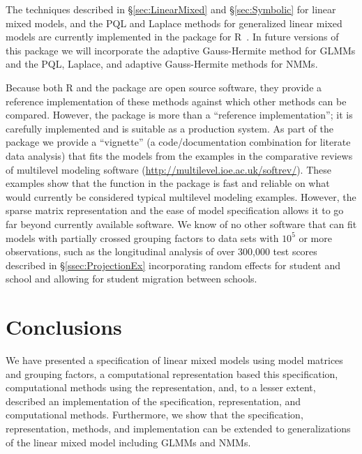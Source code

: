 \documentclass[12pt]{article}
\begin{document}
The techniques described in \S\ref{sec:LinearMixed} and
\S\ref{sec:Symbolic} for linear mixed models, and the PQL and Laplace
methods for generalized linear mixed models are currently implemented
in the  package for R~\citep{R-2.0.0}.  In future versions
of this package we will incorporate the adaptive Gauss-Hermite method
for GLMMs and the PQL, Laplace, and adaptive Gauss-Hermite methods for
NMMs.

Because both R and the  package are open source software,
they provide a reference implementation of these methods against which
other methods can be compared.  However, the package is more than a
``reference implementation''; it is carefully implemented and is
suitable as a production system.  As part of the package we provide a
``vignette'' (a code/documentation combination for literate data
analysis) that fits the models from the examples in the comparative
reviews of multilevel modeling software
(\url{http://multilevel.ioe.ac.uk/softrev/}).  These examples show
that the  function in the  package is fast and
reliable on what would currently be considered typical multilevel
modeling examples.  However, the sparse matrix representation and the
ease of model specification allows it to go far beyond currently
available software.  We know of no other software that can fit models
with partially crossed grouping factors to data sets with $10^5$ or
more observations, such as the longitudinal analysis of over 300,000
test scores described in \S\ref{ssec:ProjectionEx} incorporating
random effects for student and school and allowing for student
migration between schools.

\section{Conclusions}
\label{sec:Summary}

We have presented a specification of linear mixed models using model
matrices and grouping factors, a computational representation based
this specification, computational methods using the representation,
and, to a lesser extent, described an implementation of the
specification, representation, and computational methods.
Furthermore, we show that the specification, representation, methods,
and implementation can be extended to generalizations of the linear
mixed model including GLMMs and NMMs.
\end{document}
